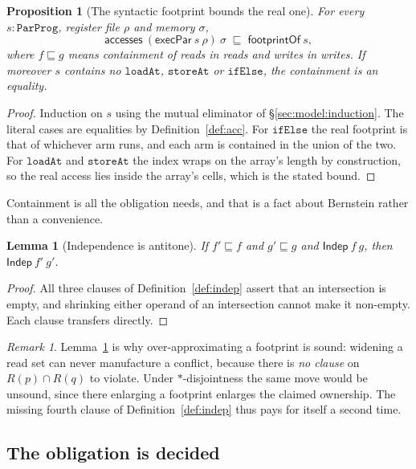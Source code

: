 \documentclass[11pt,a4paper]{article}
\theoremstyle{definition}
\theoremstyle{plain}
\newtheorem{lemma}[definition]{Lemma}
\newtheorem{proposition}[definition]{Proposition}
\theoremstyle{remark}
\newtheorem{remark}[definition]{Remark}
\newcommand{\st}{\sigma}
\newcommand{\reads}[1]{R(#1)}
\newcommand{\acc}{\mathsf{accesses}}
\newcommand{\Indep}{\mathsf{Indep}}
\begin{document}
\begin{proposition}[The syntactic footprint bounds the real one]\label{prop:langfp}
For every $s : \texttt{ParProg}$, register file $\rho$ and memory $\st$,
\[
  \acc\ (\mathsf{execPar}\ s\ \rho)\ \st \;\sqsubseteq\; \mathsf{footprintOf}\ s ,
\]
where $f \sqsubseteq g$ means containment of reads in reads and writes in writes. If moreover
$s$ contains no $\texttt{loadAt}$, $\texttt{storeAt}$ or $\texttt{ifElse}$, the containment
is an equality.
\end{proposition}

\begin{proof}
Induction on $s$ using the mutual eliminator of \S\ref{sec:model:induction}. The literal
cases are equalities by Definition~\ref{def:acc}. For $\texttt{ifElse}$ the real footprint is
that of whichever arm runs, and each arm is contained in the union of the two. For
$\texttt{loadAt}$ and $\texttt{storeAt}$ the index wraps on the array's length by
construction, so the real access lies inside the array's cells, which is the stated bound.
\end{proof}

Containment is all the obligation needs, and that is a fact about Bernstein rather than a
convenience.

\begin{lemma}[Independence is antitone]\label{lem:antitone}
If $f' \sqsubseteq f$ and $g' \sqsubseteq g$ and $\Indep\ f\ g$, then $\Indep\ f'\ g'$.
\end{lemma}

\begin{proof}
All three clauses of Definition~\ref{def:indep} assert that an intersection is empty, and
shrinking either operand of an intersection cannot make it non-empty. Each clause transfers
directly.
\end{proof}

\begin{remark}
Lemma~\ref{lem:antitone} is why over-approximating a footprint is sound: widening a read set
can never manufacture a conflict, because there is \emph{no clause} on
$\reads{p} \cap \reads{q}$ to violate. Under $\ast$-disjointness the same move would be
unsound, since there enlarging a footprint enlarges the claimed ownership. The missing fourth
clause of Definition~\ref{def:indep} thus pays for itself a second time.
\end{remark}

\subsection{The obligation is decided}\label{sec:lang:wfb}
\end{document}
